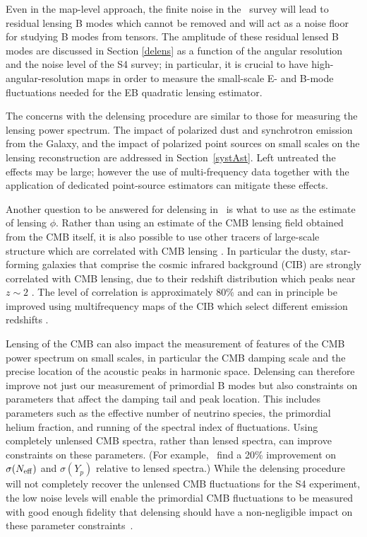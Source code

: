 Even in the map-level approach, the finite noise in the \cmbexp\ survey will lead to residual lensing B modes which cannot be removed and will act as a noise floor for studying B modes from tensors.  The amplitude of these residual lensed B modes are discussed in Section \ref{delens} as a function of the angular resolution and the noise level of the S4 survey; in particular, it is crucial to have high-angular-resolution maps in order to measure the small-scale E- and B-mode fluctuations needed for the EB quadratic lensing estimator.

The concerns with the delensing procedure are similar to those for measuring the lensing power spectrum. The impact of polarized dust and synchrotron emission from the Galaxy, and the impact of polarized point sources on small scales on the lensing reconstruction are addressed in Section~\ref{systAst}. Left untreated the effects may be large; however the use of  multi-frequency data together with the application of dedicated point-source estimators can mitigate these effects.

Another question to be answered for delensing in \cmbexp\ is what to use as the estimate of lensing $\phi$.
Rather than using an estimate of the CMB lensing field obtained from the CMB itself, it is also possible to use other tracers of large-scale structure which are correlated with  CMB lensing \cite{Smith:2010gu}.  In particular the dusty, star-forming galaxies that comprise the cosmic infrared background (CIB) are strongly correlated with CMB lensing, due to their redshift distribution which peaks near $z \sim 2$ \cite{Sherwin:2015baa,Simard:2014aqa}.  The level of correlation is approximately $80\%$ \cite{Ade:2013zuv} and can in principle be improved using multifrequency maps of the CIB which select different emission redshifts \cite{Sherwin:2015baa}.  

Lensing of the CMB can also impact the measurement of features of the CMB power spectrum on small scales, in particular the CMB damping scale and the precise location of the acoustic peaks in harmonic space.  Delensing can therefore improve not just our measurement of primordial B modes but also constraints on parameters that affect the damping tail and peak location.
This includes parameters such as the effective number of neutrino species,  the primordial helium fraction, and running of the spectral index of fluctuations.  Using completely unlensed CMB spectra, rather than lensed spectra, can improve constraints on these parameters. (For example,~\cite{Green:2016} find a 20\% improvement on $\sigma(N_\mathrm{eff})$ and $\sigma(Y_p)$ relative to lensed spectra.)  While the delensing procedure will not completely recover the unlensed CMB fluctuations for the S4 experiment, the low noise levels will enable the primordial CMB fluctuations to be measured with good enough fidelity that delensing should have a non-negligible impact on these parameter constraints~\cite{Green:2016}.
